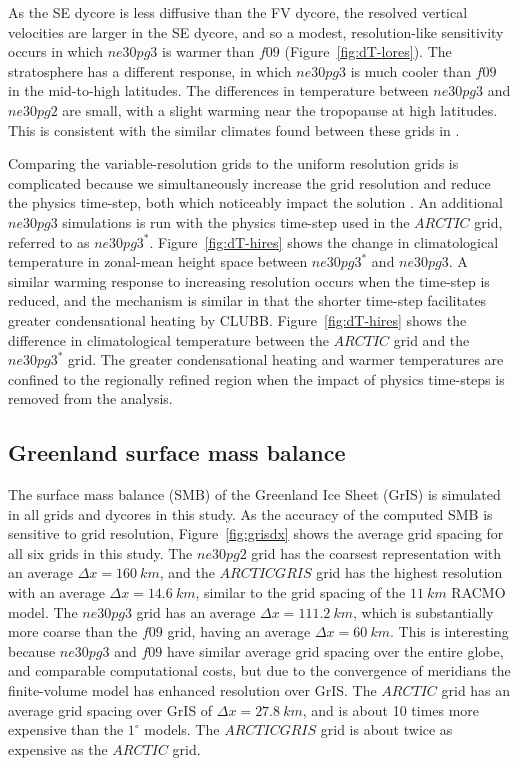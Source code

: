 \documentclass[draft]{agujournal2019}
\begin{document}
As the SE dycore is less diffusive than the FV dycore, the resolved vertical velocities are larger in the SE dycore, and so a modest, resolution-like sensitivity occurs in which $ne30pg3$ is warmer than $f09$ (Figure~\ref{fig:dT-lores}). The stratosphere has a different response, in which $ne30pg3$ is much cooler than $f09$ in the mid-to-high latitudes. The differences in temperature between $ne30pg3$ and $ne30pg2$ are small, with a slight warming near the tropopause at high latitudes. This is consistent with the similar climates found between these grids in \cite{HETAL2019JAMES}.

Comparing the variable-resolution grids to the uniform resolution grids is complicated because we simultaneously increase the grid resolution and reduce the physics time-step, both which noticeably impact the solution \cite{W2008TELLUS}. An additional $ne30pg3$ simulations is run with the physics time-step used in the $ARCTIC$ grid, referred to as $ne30pg3^{*}$. Figure~\ref{fig:dT-hires} shows the change in climatological temperature in zonal-mean height space between $ne30pg3^{*}$ and $ne30pg3$. A similar warming response to increasing resolution occurs when the time-step is reduced, and the mechanism is similar in that the shorter time-step facilitates greater condensational heating by CLUBB. Figure~\ref{fig:dT-hires} shows the difference in climatological temperature between the $ARCTIC$ grid and the $ne30pg3^{*}$ grid. The greater condensational heating and warmer temperatures are confined to the regionally refined region when the impact of physics time-steps is removed from the analysis.

\subsection{Greenland surface mass balance}

The surface mass balance (SMB) of the Greenland Ice Sheet (GrIS) is simulated in all grids and dycores in this study. As the accuracy of the computed SMB is sensitive to grid resolution, Figure~\ref{fig:grisdx} shows the average grid spacing for all six grids in this study. The $ne30pg2$ grid has the coarsest representation with an average $\Delta x=160~km$, and the $ARCTICGRIS$ grid has the highest resolution with an average $\Delta x=14.6~km$, similar to the grid spacing of the $11~km$ RACMO model. The $ne30pg3$ grid has an average $\Delta x=111.2~km$, which is substantially more coarse than the $f09$ grid, having an average $\Delta x=60~km$. This is interesting because $ne30pg3$ and $f09$ have similar average grid spacing over the entire globe, and comparable computational costs, but due to the convergence of meridians the finite-volume model has enhanced resolution over GrIS. The $ARCTIC$ grid has an average grid spacing over GrIS of $\Delta x=27.8~km$, and is about 10 times more expensive than the $1^{\circ}$ models. The $ARCTICGRIS$ grid is about twice as expensive as the $ARCTIC$ grid.
\end{document}
